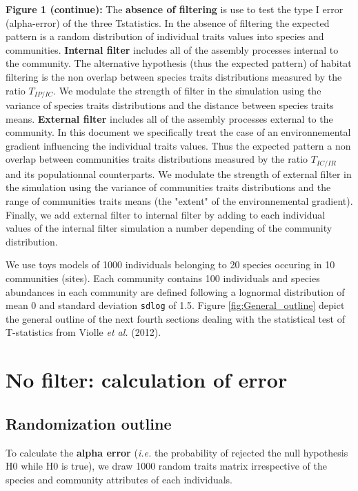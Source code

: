 \documentclass[12pt]{article}\usepackage[]{graphicx}\usepackage[]{color}
\begin{document}
\clearpage
\textbf{Figure 1 (continue):} The \textbf{absence of filtering} is use to test the type I error (alpha-error) of the three Tstatistics. In the absence of filtering the expected pattern is a random distribution of individual traits values into species and communities. \textbf{Internal filter} includes all of the assembly processes internal to the community. The alternative hypothesis (thus the expected pattern) of habitat filtering is the non overlap between species traits distributions measured by the ratio $T_{IP/IC}$. We modulate the strength of filter in the simulation using the variance of species traits distributions and the distance between species traits means. \textbf{External filter} includes all of the assembly processes external to the community. In this document we specifically treat the case of an environnemental gradient influencing the individual traits values. Thus the expected pattern a non overlap between communities traits distributions measured by the ratio $T_{IC/IR}$ and its populationnal counterparts. We modulate the strength of external filter in the simulation using the variance of communities traits distributions and the range of communities traits means (the "extent" of the environnemental gradient). Finally, we add external filter to internal filter by adding to each individual values of the internal filter simulation a number depending of the community distribution.
\vspace*{1cm}

We use toys models of 1000 individuals belonging to 20 species occuring in 10 communities (sites). Each community contains 100 individuals and species abundances in each community are defined following a lognormal distribution of mean 0 and standard deviation \texttt{sdlog} of 1.5.
Figure \ref{fig:General_outline} depict the general outline of the next fourth sections dealing with the statistical test of T-statistics from Violle \textit{et al.} (2012).



\cleardoublepage

\section{No filter: calculation of error}
 \subsection {Randomization outline}

To calculate the \textbf{alpha error} (\textit{i.e.} the probability of rejected the null hypothesis H0 while H0 is true), we draw 1000 random traits matrix irrespective of the species and community attributes of each individuals.
\end{document}
